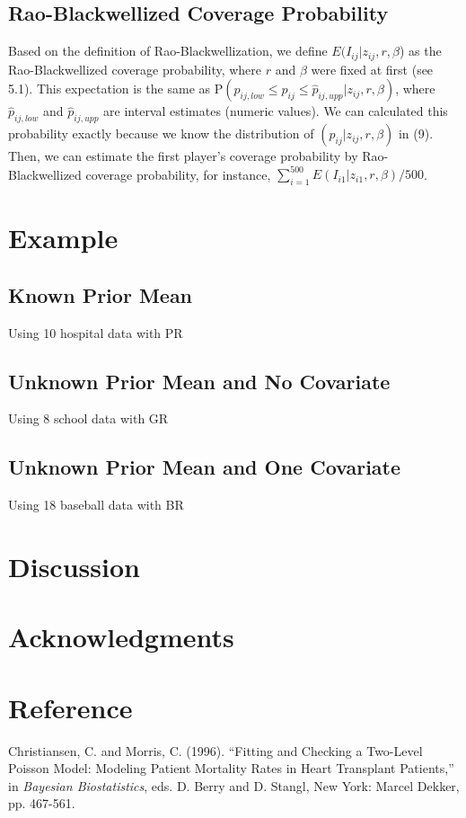 \documentclass[article]{jss}
\begin{document}
\subsection{Rao-Blackwellized Coverage Probability}
Based on the definition of Rao-Blackwellization, we define $E(I_{ij}\vert z_{ij}, r, \beta$) as the Rao-Blackwellized coverage probability, where $r$ and $\beta$ were fixed at first (see 5.1). This expectation is the same as P$(\hat{p}_{ij, low}\le p_{ij} \le\hat{p}_{ij, upp}\vert z_{ij}, r, \beta)$, where $\hat{p}_{ij, low}$ and $\hat{p}_{ij, upp}$ are interval estimates (numeric values). We can calculated this probability exactly because we know the distribution of $(p_{ij} \vert z_{ij}, r, \beta)$ in (9). Then, we can estimate the first player's coverage probability by Rao-Blackwellized coverage probability, for instance, $\sum_{i=1}^{500}E(I_{i1}\vert z_{i1}, r, \beta)/500$.
\section[Example]{Example}
\subsection[Known Prior Mean]{Known Prior Mean}
Using 10 hospital data with PR
\subsection[Unknown Prior Mean and No Covariate]{Unknown Prior Mean and No Covariate}
Using 8 school data with GR
\subsection[Unknown Prior Mean and One Covariate]{Unknown Prior Mean and One Covariate}
Using 18 baseball data with BR

\section[Discussion]{Discussion}

\section[acknowledgments]{Acknowledgments}

\section[Reference]{Reference}
Christiansen, C. and Morris, C. (1996). ``Fitting and Checking a Two-Level Poisson Model: Modeling Patient Mortality Rates in Heart Transplant Patients,'' in \emph{Bayesian Biostatistics}, eds. D. Berry and D. Stangl, New York: Marcel Dekker, pp. 467-561.
\\
\end{document}

